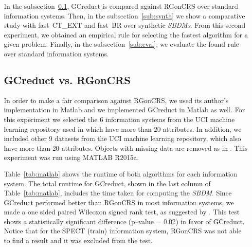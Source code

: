 \documentclass[authoryear,preprint,review,12pt]{elsarticle}
\begin{document}
	In the subsection~\ref{sub:matlab}, GCreduct is compared against RGonCRS over standard information systems. Then, in the subsection~\ref{sub:synth} we show a comparative study with fast--CT\_EXT and fast--BR over synthetic \textit{SBDMs}. From this second experiment, we obtained an empirical rule for selecting the fastest algorithm for a given problem. Finally, in the  subsection~\ref{sub:eval}, we evaluate the found rule over standard information systems.
	
\subsection{GCreduct vs. RGonCRS}\label{sub:matlab}
	In order to make a fair comparison against RGonCRS, we used its author's implementation in Matlab and we implemented GCreduct in Matlab as well. For this experiment we selected the 6 information systems from the UCI machine learning repository \citep{Bache13} used in \citep{Lias13,Sanchez10,WangP07} which have more than 20 attributes. In addition, we included other 9 datasets from the UCI machine learning repository, which also have more than 20 attributes. Objects with missing data are removed as in \citep{WangP07}. This experiment was run using MATLAB R2015a.
	
	Table~\ref{tab:matlab} shows the runtime of both algorithms for each information system. The total runtime for GCreduct, shown in the last column of Table~\ref{tab:matlab}, includes the time taken for computing the \textit{SBDM}. Since GCreduct performed better than RGonCRS in most information systems, we made a one sided paired Wilcoxon signed rank test, as suggested by \cite{Demsar2006}. This test shows a statistically significant difference (p--value = 0.02) in favor of GCreduct. Notice that for the SPECT (train) information system, RGonCRS was not able to find a result and it was excluded from the test.
	
\end{document}
